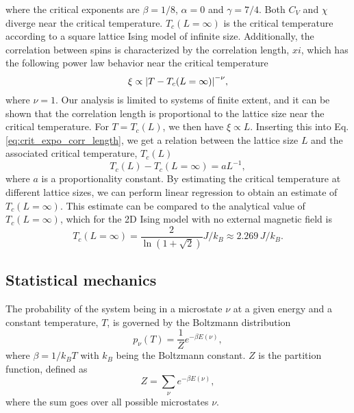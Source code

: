 where the critical exponents are $\beta=1/8$, $\alpha=0$ and $\gamma=7/4$. Both $C_V$ and $\chi$ diverge near the critical temperature. $T_c(L=\infty)$ is the critical temperature according to a square lattice Ising model of infinite size. Additionally, the correlation between spins is characterized by the correlation length, $xi$, which has the following power law behavior near the critical temperature 
\begin{equation}
    \xi \propto \abs{T - T_c(L=\infty)}^{-\nu}, \label{eq:crit_expo_corr_length}
\end{equation}
where $\nu=1$. Our analysis is limited to systems of finite extent, and it can be shown  that the correlation length is proportional to the lattice size near the critical temperature. For $T=T_c(L)$, we then have $\xi\propto L$. Inserting this into Eq. \eqref{eq:crit_expo_corr_length}, we get a relation between the lattice size $L$ and the associated critical temperature, $T_c(L)$
\begin{equation}
    T_c(L) - T_c(L=\infty) = aL^{-1}, \label{eq:finite_size_scaling_relation}
\end{equation}  
where $a$ is a proportionality constant. By estimating the critical temperature at different lattice sizes, we can perform linear regression to obtain an estimate of $T_c(L=\infty)$. This estimate can be compared to the analytical value of $T_c(L=\infty)$, which for the 2D Ising model with no external magnetic field is \cite{Onsager_Ising2D}
\begin{equation}
    T_c(L=\infty) = \frac{2}{\ln(1+\sqrt{2})} J/k_B \approx 2.269\,J/k_B. \label{eq:onsager_critical_temperature}
\end{equation}


\subsection{Statistical mechanics}\label{subsec_theory:statistical_mechanics}

The probability of the system being in a microstate $\nu$ at a given energy and a constant temperature, $T$, is governed by the Boltzmann distribution
\begin{equation}\label{eq:boltzmann_distr}
    p_\nu (T) = \frac{1}{Z}e^{-\beta E(\nu)},
\end{equation} 
where $\beta=1/k_B T$ with $k_B$ being the Boltzmann constant. $Z$ is the partition function, defined as 
\begin{equation}\label{eq:partition_function}
    Z = \sum_\nu e^{-\beta E(\nu)},
\end{equation}  
where the sum goes over all possible microstates $\nu$. 

